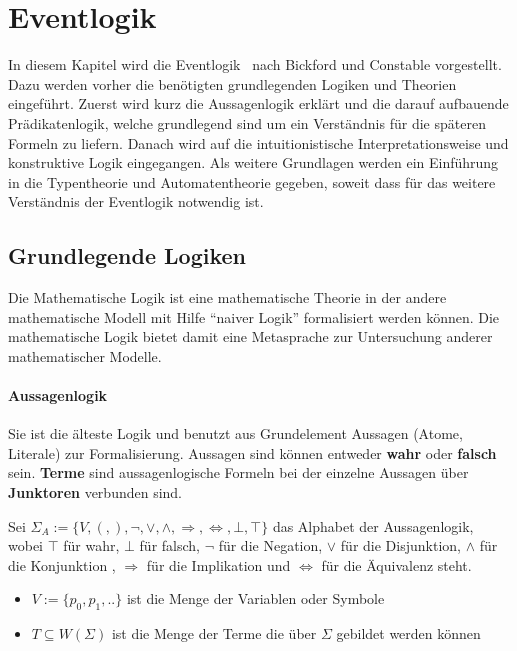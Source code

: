 \section{Eventlogik}
\label{sec_logik}

In diesem Kapitel wird die Eventlogik~\cite{bickford2003logic} nach Bickford und
Constable vorgestellt. Dazu werden vorher die benötigten grundlegenden Logiken
und Theorien eingeführt. Zuerst wird kurz die Aussagenlogik erklärt und die
darauf aufbauende Prädikatenlogik, welche grundlegend sind um ein Verständnis
für die späteren Formeln zu liefern. Danach wird auf die intuitionistische
Interpretationsweise und konstruktive Logik eingegangen. Als weitere Grundlagen
werden ein Einführung in die Typentheorie und Automatentheorie gegeben, soweit
dass für das weitere Verständnis der Eventlogik notwendig ist.

\subsection{Grundlegende Logiken}
Die Mathematische Logik ist eine mathematische Theorie in der andere
mathematische Modell mit Hilfe "`naiver Logik"' formalisiert werden können.
Die mathematische Logik bietet damit eine Metasprache zur Untersuchung anderer
mathematischer Modelle.~\cite{heinemann2013logik}

\paragraph{Aussagenlogik}
Sie ist die älteste Logik und benutzt aus Grundelement Aussagen (Atome,
Literale) zur Formalisierung. Aussagen sind können entweder \textbf{wahr}
oder \textbf{falsch} sein. \textbf{Terme} sind aussagenlogische Formeln
bei der einzelne Aussagen über \textbf{Junktoren} verbunden sind.~\cite{heinemann2013logik}

\begin{defi}
  Sei $\Sigma_A := \{V,(,),\neg,\vee,\wedge,\Rightarrow,\Leftrightarrow,\bot,\top\}$ das Alphabet der Aussagenlogik, wobei $\top$ für
wahr, $\bot$ für falsch, $\neg$ für die Negation, $\vee$ für die Disjunktion, $\wedge$ für die
Konjunktion , $\Rightarrow$ für die Implikation und $\Leftrightarrow$ für die Äquivalenz steht.
\begin{itemize}
\item $V:=\{p_0,p_1,..\}$  ist die Menge der Variablen oder Symbole
\item $T\subseteq W(\Sigma)$  ist die Menge der Terme die über $\Sigma$ gebildet werden können 
\end{itemize}
\end{defi}

